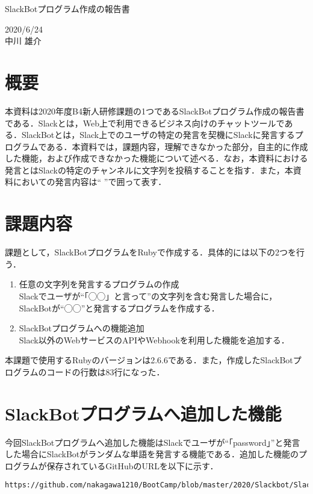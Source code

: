 \documentclass[12pt]{jsarticle}
\begin{document}
\begin{center}
{\LARGE SlackBotプログラム作成の報告書}
\end{center}

\begin{flushright}
  2020/6/24\\
  中川 雄介
\end{flushright}
\section{概要}\label{sec1}
\label{sec:introduction}
本資料は2020年度B4新人研修課題の1つであるSlackBotプログラム作成の報告書である．Slackとは，Web上で利用できるビジネス向けのチャットツールである．SlackBotとは，Slack上でのユーザの特定の発言を契機にSlackに発言するプログラムである．本資料では，課題内容，理解できなかった部分，自主的に作成した機能，および作成できなかった機能について述べる．なお，本資料における発言とはSlackの特定のチャンネルに文字列を投稿することを指す．また，本資料においての発言内容は`` ''で囲って表す．

\section{課題内容}\label{sec2}
課題として，SlackBotプログラムをRubyで作成する．具体的には以下の2つを行う．
\begin{enumerate}
\item 任意の文字列を発言するプログラムの作成\\
  Slackでユーザが``「◯◯」と言って''の文字列を含む発言した場合に，SlackBotが``◯◯''と発言するプログラムを作成する．\label{item1}
\item SlackBotプログラムへの機能追加\\
  Slack以外のWebサービスのAPIやWebhookを利用した機能を追加する．\label{item2}
  
\end{enumerate}
本課題で使用するRubyのバージョンは2.6.6である．また，作成したSlackBotプログラムのコードの行数は83行になった．
\section{SlackBotプログラムへ追加した機能}\label{func}
今回SlackBotプログラムへ追加した機能はSlackでユーザが``「password」''と発言した場合にSlackBotがランダムな単語を発言する機能である．追加した機能のプログラムが保存されているGitHubのURLを以下に示す．
\begin{verbatim}
https://github.com/nakagawa1210/BootCamp/blob/master/2020/Slackbot/SlackBot.rb
\end{verbatim}
\end{document}
